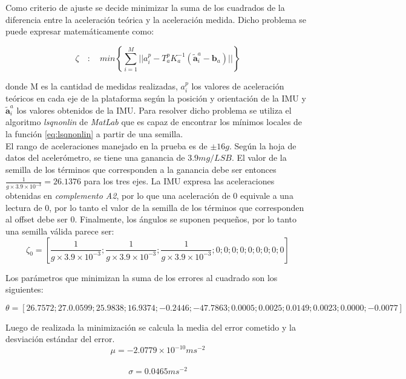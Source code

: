 \documentclass[main]{subfiles}
\begin{document}
Como criterio de ajuste se decide minimizar la suma de los cuadrados de la diferencia entre la aceleración teórica y la aceleración medida. Dicho problema se puede expresar matemáticamente como:

\begin{equation}
\label{eq:lsqnonlin}
\zeta \quad : \quad  min \left\lbrace \sum_{i=1}^{M} {\vert \vert a_{i}^p-T_a^pK_a^{-1}\left(\tilde{\mathbf{a}}_{i}^a -\mathbf{b}_a \right)\vert \vert} \right\rbrace
\end{equation}

donde M es la cantidad de medidas realizadas, $a_{i}^p$ los valores de aceleración teóricos en cada eje de la plataforma según la posición y orientación de la IMU y $\tilde{\mathbf{a}}_{i}^a$ los valores obtenidos de la IMU.
Para resolver dicho problema se utiliza el algoritmo \emph{lsqnonlin} de \emph{MatLab} que es capaz de encontrar los m\'inimos locales de la funci\'on \ref{eq:lsqnonlin} a partir de una semilla.\\

El rango de aceleraciones manejado en la prueba es de $\pm 16g$. Según la hoja de datos del acelerómetro, se tiene una ganancia de $3.9 mg/LSB$. El valor de la semilla de los t\'erminos que corresponden a la ganancia debe ser entonces $\frac{1}{g \times 3.9 \times 10^{-3}}=26.1376$ para los tres ejes. La IMU expresa las aceleraciones obtenidas en \emph{complemento A2}, por lo que una aceleración de 0 equivale a una lectura de 0, por lo tanto el valor de la semilla de los t\'erminos que corresponden al offset debe ser 0. Finalmente, los ángulos se suponen pequeños, por lo tanto una semilla válida parece ser: 
\begin{equation}
\zeta_0=\left[ \frac{1}{g \times 3.9 \times 10^{-3}}; \frac{1}{g \times 3.9 \times 10^{-3}}; \frac{1}{g \times 3.9 \times 10^{-3}}; 0; 0; 0; 0; 0; 0; 0; 0; 0 \right]
\end{equation}

Los parámetros que minimizan la suma de los errores al cuadrado son los siguientes:

\begin{scriptsize}
\begin{equation}
\theta=\left[ 26.7572 ; 27.0.0599 ; 25.9838 ; 16.9374 ; -0.2446 ; -47.7863 ; 0.0005 ; 0.0025 ; 0.0149 ; 0.0023 ; 0.0000 ; -0.0077  \right]\end{equation}\end{scriptsize}

Luego de realizada la minimización se calcula la media del error cometido y la desviación estándar del error.
$$\mu=-2.0779 \times 10^{-10} ms^{-2}$$ \\
$$\sigma =  0.0465 ms^{-2}$$ 
 
\end{document}
